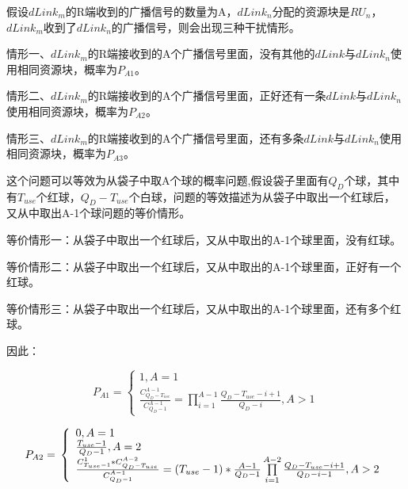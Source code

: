 \documentclass[figurelist,tablelist,algorithmlist,nomlist,masters]{seuthesix}
\begin{document}
	假设$dLink_m$的R端收到的广播信号的数量为A，$dLink_n$分配的资源块是$RU_n$，$dLink_m$收到了$dLink_n$的广播信号，则会出现三种干扰情形。
	
	情形一、$dLink_m$的R端接收到的A个广播信号里面，没有其他的$dLink$与$dLink_n$使用相同资源块，概率为$P_{A1}$。
	
	情形二、$dLink_m$的R端接收到的A个广播信号里面，正好还有一条$dLink$与$dLink_n$使用相同资源块，概率为$P_{A2}$。
	
	情形三、$dLink_m$的R端接收到的A个广播信号里面，还有多条$dLink$与$dLink_n$使用相同资源块，概率为$P_{A3}$。
	
	这个问题可以等效为从袋子中取A个球的概率问题,假设袋子里面有$Q_D$个球，其中有$T_{use}$个红球，$Q_D - T_{use}$个白球，问题的等效描述为从袋子中取出一个红球后，又从中取出A-1个球问题的等价情形。
	
	等价情形一：从袋子中取出一个红球后，又从中取出的A-1个球里面，没有红球。
	
	等价情形二：从袋子中取出一个红球后，又从中取出的A-1个球里面，正好有一个红球。
	
	等价情形三：从袋子中取出一个红球后，又从中取出的A-1个球里面，还有多个红球。
	
	因此：
	
	
	
	\begin{equation}\label{eq3.1}
	{P_{A1}} = \left\{ \begin{array}{l}
	1,A = 1\\
	\frac{{C_{{Q_D} - {T_{use}}}^{A - 1}}}{{C_{{Q_D} - 1}^{A - 1}}} = \prod\limits_{i = 1}^{A - 1} {\frac{{{Q_D} - {T_{use}} - i + 1}}{{{Q_D} - i}},A > 1}
	\end{array} \right.
	\end{equation}
	
	\begin{equation}\label{eq3.1}
	{P_{A2}} = {\rm{ }}\left\{ \begin{array}{l}
	0,A = 1\\
	\frac{{{T_{use}} - 1}}{{{Q_D} - 1}},A = 2\\
	\frac{{C_{{T_{use}} - 1}^1*C_{{Q_D} - {T_{use}}}^{A - 2}}}{{C_{{Q_D} - 1}^{A - 1}}} = ({T_{use}} - 1)*\frac{{A - 1}}{{{Q_D} - 1}}\prod\limits_{i = 1}^{A - 2} {\frac{{{Q_D} - {T_{use}} - i + 1}}{{{Q_D} - i - 1}},A > 2}
	\end{array} \right.
	\end{equation}
	
\end{document}

